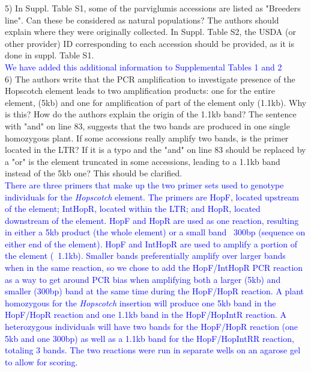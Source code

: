 \documentclass[11pt]{article}
\newcommand{\res}[1]{\noindent \textcolor{blue}{{#1}} \\}
\begin{document}
5) In Suppl. Table S1, some of the parviglumis accessions are listed as "Breeders line". Can these be considered as natural populations? The authors should explain where they were originally collected. In Suppl. Table S2, the USDA (or other provider) ID corresponding to each accession should be provided, as it is done in suppl. Table S1.\\

\res{We have added this additional information to Supplemental Tables 1 and 2}


6) The authors write that the PCR amplification to investigate presence of the Hopscotch element leads to two amplification products: one for the entire element, (5kb) and one for amplification of part of the element only (1.1kb). Why is this? How do the authors explain the origin of the 1.1kb band? The sentence with "and" on line 83, suggests that the two bands are produced in one single homozygous plant. If some accessions really amplify two bands, is the primer located in the LTR? If it is a typo and the "and" on line 83 should be replaced by a "or" is the element truncated in some accessions, leading to a 1.1kb band instead of the 5kb one? This should be clarified.\\

\res{There are three primers that make up the two primer sets used to genotype individuals for the \emph{Hopscotch} element. The primers are HopF, located upstream of the element; IntHopR, located within the LTR; and HopR, located downstream of the element. HopF and HopR are used as one reaction, resulting in either a 5kb product (the whole element) or a small band ~300bp (sequence on either end of the element). HopF and IntHopR are used to amplify a portion of the element (~1.1kb). Smaller bands preferentially amplify over larger bands when in the same reaction, so we chose to add the HopF/IntHopR PCR reaction as a way to get around PCR bias when amplifying both a larger (5kb) and smaller (300bp) band at the same time during the HopF/HopR reaction. A plant homozygous for the \emph{Hopscotch} insertion will produce one 5kb band in the HopF/HopR reaction and one 1.1kb band in the HopF/HopIntR reaction. A heterozygous individuals will have two bands for the HopF/HopR reaction (one 5kb and one 300bp) as well as a 1.1kb band for the HopF/HopIntRR reaction, totaling 3 bands. The two reactions were run in separate wells on an agarose gel to allow for scoring.}
\end{document}
